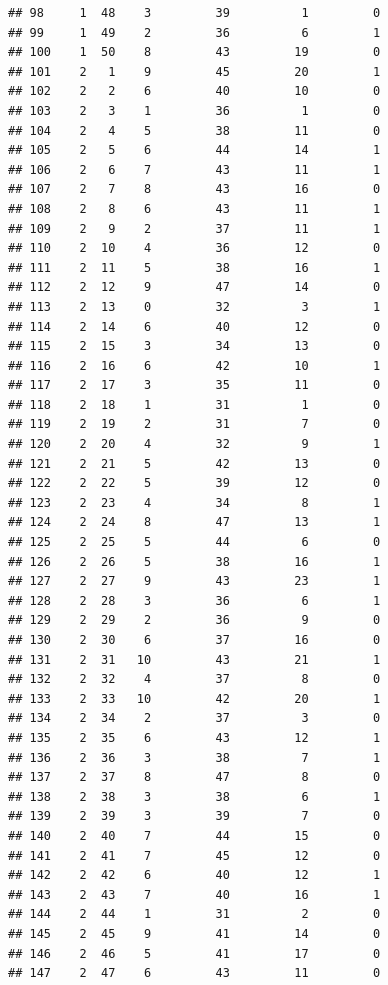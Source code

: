 \documentclass[]{book}
\begin{document}
\begin{verbatim}
## 98     1  48    3         39          1         0
## 99     1  49    2         36          6         1
## 100    1  50    8         43         19         0
## 101    2   1    9         45         20         1
## 102    2   2    6         40         10         0
## 103    2   3    1         36          1         0
## 104    2   4    5         38         11         0
## 105    2   5    6         44         14         1
## 106    2   6    7         43         11         1
## 107    2   7    8         43         16         0
## 108    2   8    6         43         11         1
## 109    2   9    2         37         11         1
## 110    2  10    4         36         12         0
## 111    2  11    5         38         16         1
## 112    2  12    9         47         14         0
## 113    2  13    0         32          3         1
## 114    2  14    6         40         12         0
## 115    2  15    3         34         13         0
## 116    2  16    6         42         10         1
## 117    2  17    3         35         11         0
## 118    2  18    1         31          1         0
## 119    2  19    2         31          7         0
## 120    2  20    4         32          9         1
## 121    2  21    5         42         13         0
## 122    2  22    5         39         12         0
## 123    2  23    4         34          8         1
## 124    2  24    8         47         13         1
## 125    2  25    5         44          6         0
## 126    2  26    5         38         16         1
## 127    2  27    9         43         23         1
## 128    2  28    3         36          6         1
## 129    2  29    2         36          9         0
## 130    2  30    6         37         16         0
## 131    2  31   10         43         21         1
## 132    2  32    4         37          8         0
## 133    2  33   10         42         20         1
## 134    2  34    2         37          3         0
## 135    2  35    6         43         12         1
## 136    2  36    3         38          7         1
## 137    2  37    8         47          8         0
## 138    2  38    3         38          6         1
## 139    2  39    3         39          7         0
## 140    2  40    7         44         15         0
## 141    2  41    7         45         12         0
## 142    2  42    6         40         12         1
## 143    2  43    7         40         16         1
## 144    2  44    1         31          2         0
## 145    2  45    9         41         14         0
## 146    2  46    5         41         17         0
## 147    2  47    6         43         11         0

\end{verbatim}
\end{document}
